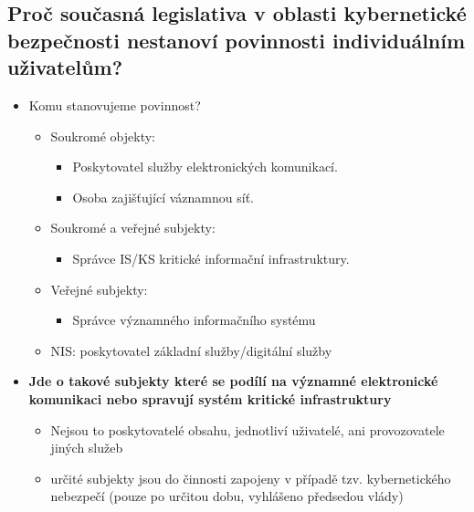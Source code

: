 \subsection{Proč současná legislativa v oblasti kybernetické bezpečnosti nestanoví povinnosti individuálním uživatelům?}
\begin{itemize}
    \item Komu stanovujeme povinnost?
          \begin{itemize}
              \item Soukromé objekty:
                    \begin{itemize}
                        \item Poskytovatel služby elektronických komunikací.
                        \item Osoba zajišťující váznamnou síť.
                    \end{itemize}
              \item Soukromé a veřejné subjekty:
                    \begin{itemize}
                        \item Správce IS/KS kritické informační infrastruktury.
                    \end{itemize}
              \item Veřejné subjekty:
                    \begin{itemize}
                        \item Správce významného informačního systému
                    \end{itemize}
              \item NIS: poskytovatel základní služby/digitální služby
          \end{itemize}
    \item \textbf{Jde o takové subjekty které se podílí na významné elektronické komunikaci nebo spravují systém kritické infrastruktury }
          \begin{itemize}
              \item Nejsou to poskytovatelé obsahu, jednotliví uživatelé, ani provozovatele jiných služeb
              \item určité subjekty jsou do činnosti zapojeny v případě tzv. kybernetického nebezpečí (pouze po určitou dobu, vyhlášeno předsedou vlády)
          \end{itemize}
\end{itemize}


